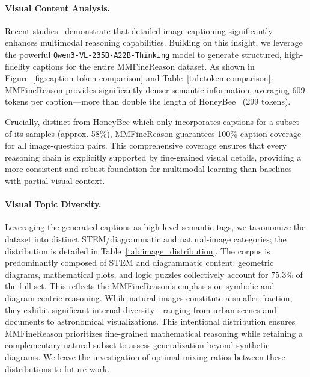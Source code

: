 \paragraph{Visual Content Analysis.}
Recent studies~\cite{llava-cot,xia2025visionary} demonstrate that detailed image captioning significantly enhances multimodal reasoning capabilities. Building on this insight, we leverage the powerful \texttt{Qwen3-VL-235B-A22B-Thinking} model to generate structured, high-fidelity captions for the entire MMFineReason dataset. As shown in Figure~\ref{fig:caption-token-comparison} and Table~\ref{tab:token-comparison}, MMFineReason provides significantly denser semantic information, averaging 609 tokens per caption—more than double the length of HoneyBee~\cite{honeybee} (299 tokens). 

Crucially, distinct from HoneyBee which only incorporates captions for a subset of its samples (approx. 58\%), MMFineReason guarantees 100\% caption coverage for all image-question pairs. This comprehensive coverage ensures that every reasoning chain is explicitly supported by fine-grained visual details, providing a more consistent and robust foundation for multimodal learning than baselines with partial visual context.

\paragraph{Visual Topic Diversity.}
Leveraging the generated captions as high-level semantic tags, we taxonomize the dataset into distinct STEM/diagrammatic and natural-image categories; the distribution is detailed in Table~\ref{tab:image_distribution}. The corpus is predominantly composed of STEM and diagrammatic content: geometric diagrams, mathematical plots, and logic puzzles collectively account for $75.3\%$ of the full set. This reflects the MMFineReason's emphasis on symbolic and diagram-centric reasoning. While natural images constitute a smaller fraction, they exhibit significant internal diversity—ranging from urban scenes and documents to astronomical visualizations. This intentional distribution ensures MMFineReason prioritizes fine-grained mathematical reasoning while retaining a complementary natural subset to assess generalization beyond synthetic diagrams. We leave the investigation of optimal mixing ratios between these distributions to future work.


